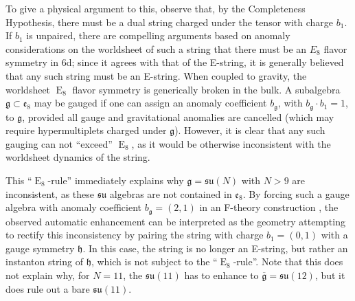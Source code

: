 \documentclass[11pt, a4paper]{article}
\newcommand*{\fkg}{\ensuremath{\mathfrak{g}}}
\newcommand*{\fkh}{\ensuremath{\mathfrak{h}}}
\DeclareMathOperator{\gE}{E}
\newcommand*{\fksu}{\ensuremath{\mathfrak{su}}}
\newcommand*{\fke}{\ensuremath{\mathfrak{e}}}
\begin{document}
To give a physical argument to this, observe that, by the Completeness Hypothesis, there must be a dual string charged under the tensor with charge $b_1$.
If $b_1$ is unpaired, there are compelling arguments \cite{Shimizu:2016lbw} based on anomaly considerations on the worldsheet of such a string that there must be an $E_8$ flavor symmetry in 6d; since it agrees with that of the E-string, it is generally believed that any such string must be an E-string.
When coupled to gravity, the worldsheet $\gE_8$ flavor symmetry is generically broken in the bulk.
A subalgebra $\fkg \subset \fke_8$ may be gauged if one can assign an anomaly coefficient $b_\fkg$, with $b_\fkg \cdot b_1 = 1$, to $\fkg$, provided all gauge and gravitational anomalies are cancelled (which may require hypermultiplets charged under $\fkg$).
However, it is clear that any such gauging can not ``exceed'' $\gE_8$, as it would be otherwise inconsistent with the worldsheet dynamics of the string.

This ``$\gE_8$-rule'' \cite{Witten:1996qb,Morrison:2012np,Heckman:2013pva,Johnson:2016qar} immediately explains why $\fkg = \fksu(N)$ with $N>9$ are inconsistent, as these $\fksu$ algebras are not contained in $\fke_8$.
By forcing such a gauge algebra with anomaly coefficient $b_\fkg = (2,1)$ in an F-theory construction \cite{Raghuram:2020vxm}, the observed automatic enhancement can be interpreted as the geometry attempting to rectify this inconsistency by pairing the string with charge $b_1 = (0,1)$ with a gauge symmetry $\fkh$.
In this case, the string is no longer an E-string, but rather an instanton string of $\fkh$, which is not subject to the ``$\gE_8$-rule''.
Note that this does not explain why, for $N=11$, the $\fksu(11)$ has to enhance to $\overline{\fkg} = \fksu(12)$, but it does rule out a bare $\fksu(11)$.
\end{document}
